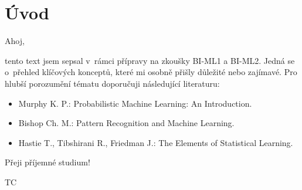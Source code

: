 \section{Úvod}

Ahoj,

tento text jsem sepsal v~rámci přípravy na zkoušky BI-ML1 a BI-ML2. Jedná se o~přehled klíčových konceptů, které mi osobně přišly důležité nebo zajímavé. Pro hlubší porozumění tématu doporučuji následující literaturu:
\begin{itemize}
    \item Murphy K. P.: Probabilistic Machine Learning: An Introduction.
    \item Bishop Ch. M.: Pattern Recognition and Machine Learning.
    \item Hastie T., Tibshirani R., Friedman J.: The Elements of Statistical Learning.
\end{itemize}

Přeji příjemné studium!

\begin{flushright}
    TC
\end{flushright}
